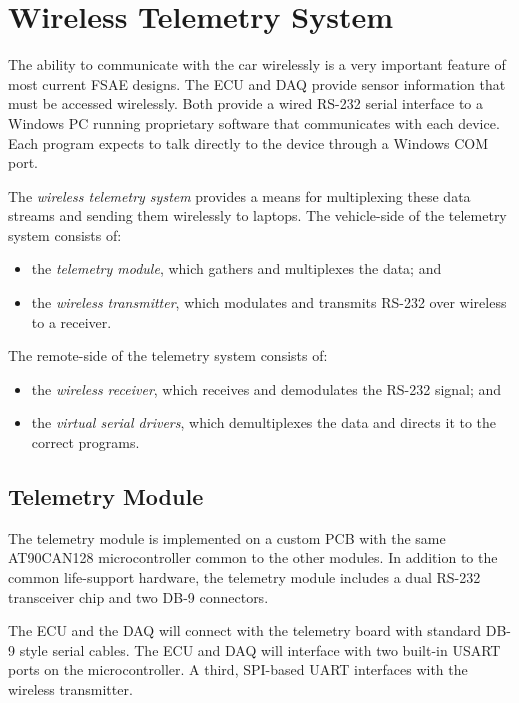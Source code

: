 %
%

\section{Wireless Telemetry System}

The ability to communicate with the car wirelessly is a very important feature of most current FSAE designs. The ECU and DAQ provide sensor information that must be accessed wirelessly. Both provide a wired RS-232 serial interface to a Windows PC running proprietary software that communicates with each device. Each program expects to talk directly to the device through a Windows COM port.

The \emph{wireless telemetry system} provides a means for multiplexing these data streams and sending them wirelessly to laptops. The vehicle-side of the telemetry system consists of:

\begin{itemize}
\item the \emph{telemetry module}, which gathers and multiplexes the data; and
\item the \emph{wireless transmitter}, which modulates and transmits RS-232 over wireless to a receiver.
\end{itemize}

The remote-side of the telemetry system consists of:

\begin{itemize}
\item the \emph{wireless receiver}, which receives and demodulates the RS-232 signal; and
\item the \emph{virtual serial drivers}, which demultiplexes the data and directs it to the correct programs.
\end{itemize}

\subsection{Telemetry Module}

The telemetry module is implemented on a custom PCB with the same AT90CAN128 microcontroller common to the other modules. In addition to the common life-support hardware, the telemetry module includes a dual RS-232 transceiver chip and two DB-9 connectors. 

The ECU and the DAQ will connect with the telemetry board with standard DB-9 style serial cables. The ECU and DAQ will interface with two built-in USART ports on the microcontroller. A third, SPI-based UART interfaces with the wireless transmitter. 

